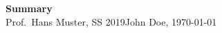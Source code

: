 \documentclass[
	paper=a4,%
	pagesize,%
	8pt, fleqn,%
	headings=small,%
	notitlepage,%
	parskip=never]%
	{scrreprt}
\newcommand{\mytitle}{Summary}
\newcommand{\myauthor}{John Doe}
\newcommand{\myprofessor}{Prof.\ Hans Muster}
\newcommand{\mydate}{SS 2019}
\begin{document}
\begin{multicols*}{3}

{\bfseries\sffamily\LARGE\mytitle} \vspace{0.35em} \\ \myprofessor, \mydate  \hfill \myauthor, \today \vspace{0.5em}

\tableofcontents



%

\appendix


\nocite{*}
\printbibliography

\end{multicols*}
\end{document}
